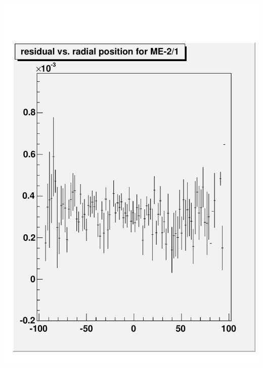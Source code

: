 \documentclass[compress]{beamer}
\begin{document}
\begin{frame}
\begin{columns}
\includegraphics[width=\linewidth]{residual_vsradialpos.pdf}

\end{columns}
\end{frame}
\end{document}
